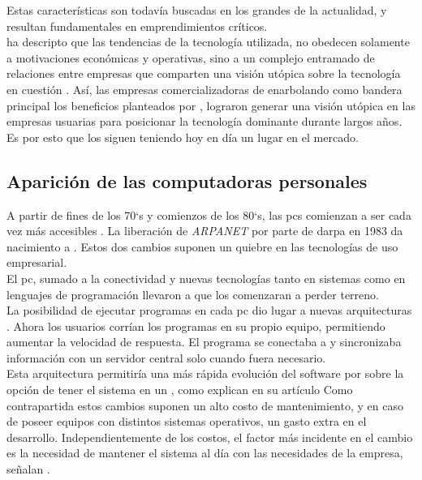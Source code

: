 Estas características son todavía buscadas en los grandes \mainframes de la
actualidad, y resultan fundamentales en emprendimientos críticos.\\
 ha descripto que las tendencias de la
tecnología utilizada, no obedecen solamente a motivaciones económicas y
operativas, sino a un complejo entramado de relaciones entre empresas que 
comparten una visión utópica sobre la tecnología en cuestión
. Así, las empresas comercializadoras de
\mainframes enarbolando como bandera principal los beneficios planteados por
\citeauthor{Stephens:2008:BOOK}, lograron generar una visión utópica en las
empresas usuarias para posicionar la tecnología dominante durante largos años.
Es por esto que los \mainframes siguen teniendo hoy en día un lugar en el
mercado.\\
 
\subsection{Aparición de las computadoras personales}
\label{subsec:history:about_web:pc_era}

A partir de fines de los 70`s y comienzos de los 80`s, las \acp{pc}
comienzan a ser cada vez más accesibles .
La liberación de \emph{ARPANET} por parte de \acs{darpa} en 1983 da nacimiento
a \internet. Estos dos cambios suponen un quiebre en las tecnologías de uso
empresarial.\\
El \ac{pc}, sumado a la conectividad y nuevas tecnologías tanto en sistemas
como en lenguajes de programación llevaron a que los \mainframes comenzaran a
perder terreno.\\
La posibilidad de ejecutar programas en cada \ac{pc} dio lugar a nuevas
arquitecturas \clientserver. Ahora los usuarios corrían los programas en su 
propio equipo, permitiendo aumentar la velocidad de respuesta. El programa se
conectaba a \internet y sincronizaba información con un servidor central solo 
cuando fuera necesario.\\
Esta arquitectura permitiría una más rápida evolución del software por sobre la 
opción de tener el sistema en un \mainframe, como explican
 en su artículo 
\period Como contrapartida estos cambios suponen
un alto costo de mantenimiento, y en caso de poseer equipos con distintos
sistemas operativos, un gasto extra en el desarrollo. Independientemente de los 
costos, el factor más incidente en el cambio es la necesidad de mantener el 
sistema al día con las necesidades de la empresa, señalan 
\citeauthor{Duncan:1996:ARTICLE}.

